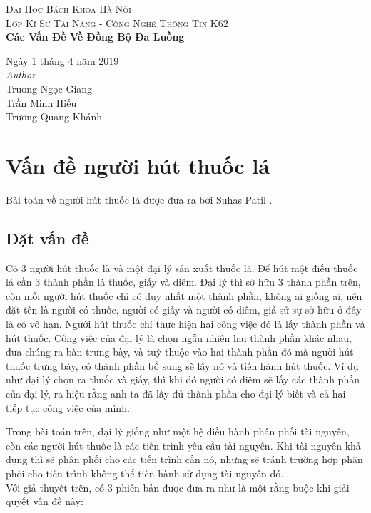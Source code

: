 \documentclass[a4paper]{article}
\begin{document}
\textsc{\LARGE Đại Học Bách Khoa Hà Nội} \\[1,5cm]
	\textsc{\large Lớp Kĩ Sư Tài Năng - Công Nghệ Thông Tin K62} \\[0.5cm]
	{\huge\bfseries Các Vấn Đề Về Đồng Bộ Đa Luồng}\\[0.4cm] 
	
		\begin{flushleft}
			\large
			Ngày 1 tháng 4 năm 2019 \\[0.5cm]
			\textit{Author}\\[0,3cm]
			   Trương Ngọc Giang \\
			   Trần Minh Hiếu  \\
			   Trương Quang Khánh \\
		\end{flushleft}
		
	\tableofcontents
	
	\section{Vấn đề người hút thuốc lá}
	Bài toán về người hút thuốc lá được đưa ra bởi Suhas Patil \cite{littlebook4}.
	\subsection{Đặt vấn đề}
	
	
	\begin{tcolorbox}
		Có 3 người hút thuốc là và một đại lý sản xuất thuốc lá. Để hút một điếu thuốc lá cần 3 thành 
		phần là thuốc, giấy và diêm. Đại lý thì sở hữu 3 thành phần trên, còn mỗi người hút thuốc
		chỉ có duy nhất một thành phần, không ai giống ai, nên đặt tên là người có thuốc, người có giấy
		và người có diêm, giả sử sự sở hữu ở đây là có vô hạn. Người hút thuốc chỉ thực hiện hai công
		việc đó là lấy thành phần và hút thuốc. Công việc của đại lý là chọn ngẫu nhiên hai thành phần 
		khác nhau, đưa chúng ra bàn trưng bày, và tuỳ thuộc vào hai thành phần đó mà người hút thuốc trưng bày,
		có thành phần bổ sung sẽ lấy nó
		và tiến hành hút thuốc. Ví dụ như đại lý chọn ra thuốc và giấy, thì khi đó người có diêm sẽ lấy 
		các thành phần của đại lý, ra hiệu rằng anh ta đã lấy đủ thành phần cho đại lý biết và cả hai tiếp
		tục công việc của mình.
	\end{tcolorbox}

	Trong bài toán trên, đại lý giống như một hệ điều hành phân phối tài nguyên, còn các người hút thuốc
	là các tiến trình yêu cầu tài nguyên. Khi tài nguyên khả dụng thì sẽ phân phối cho các tiến trình cần
	nó, nhưng sẽ tránh trường hợp phân phối cho tiến trình không thể tiến hành sử dụng tài nguyên đó. \\
	Với giả thuyết trên, có 3 phiên bản được đưa ra như là một rằng buộc khi giải quyết vấn đề này:
\end{document}
